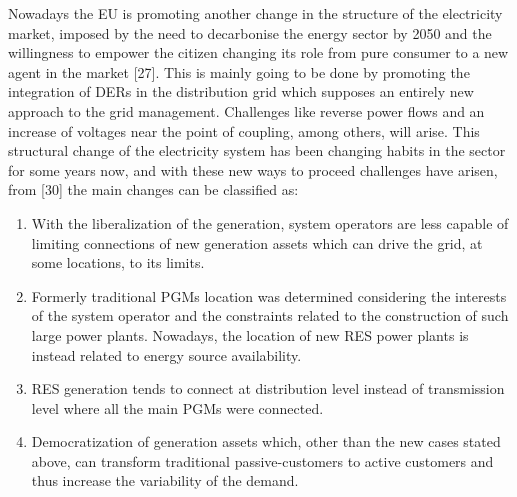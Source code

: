 Nowadays the EU is promoting another change in the structure of the electricity market, imposed by the need to decarbonise the energy sector by 2050 and the willingness to empower the citizen changing its role from pure consumer to a new agent in the market [27]. This is mainly going to be done by promoting the integration of DERs in the distribution grid which supposes an entirely new approach to the grid management. Challenges like reverse power flows and an increase of voltages near the point of coupling, among others, will arise. This structural change of the electricity system has been changing habits in the sector for some years now, and with 
these new ways to proceed challenges have arisen, from [30] the main changes can be classified as:

\begin{enumerate}
\item With the liberalization of the generation, system operators are less capable of limiting
connections of new generation assets which can drive the grid, at some locations, to its
limits.
\item Formerly traditional PGMs location was determined considering the interests of the system
operator and the constraints related to the construction of such large power plants.
Nowadays, the location of new RES power plants is instead related to energy source availability.
\item RES generation tends to connect at distribution level instead of transmission level where
all the main PGMs were connected.
\item Democratization of generation assets which, other than the new cases stated above, can
transform traditional passive-customers to active customers and thus increase the variability
of the demand.

\end{enumerate}

